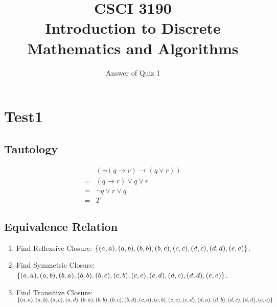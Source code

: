\documentclass{../../cls/sig-alternate-05-2015}
\begin{document}






%

\title{CSCI 3190 \\ Introduction to Discrete Mathematics and Algorithms}
\subtitle{Answer of Quiz 1}

\maketitle

\section{Test1}
\subsection{Tautology}
\begin{align}
	& (\neg (q \rightarrow r) \rightarrow (q \vee r))\\
	= & (q \rightarrow r) \vee q \vee r\\
	= & \neg q \vee r \vee q\\
	= & T
\end{align}

\subsection{Equivalence Relation}
\begin{enumerate}
	\item Find Reflexsive Closure: $\{(a, a), (a, b), (b, b), (b, c), \\(c, c), (d, c), (d, d), (e, e)\}$.
	\item Find Symmetric Closure: $\{(a, a), (a, b), (b, a), (b, b), \\(b, c), (c, b), (c, c), (c, d), (d, c), (d, d), (e, e)\}$.
	\item Find Transitive Closure: $\{(a, a), (a, b), (a, c), (a, d), \\(b, a), (b, b), (b, c), (b, d), (c, a), (c, b), (c, c), (c, d), (d, a), \\(d, b), (d, c), (d, d), (e, e)\}$
\end{enumerate}
\end{document}
